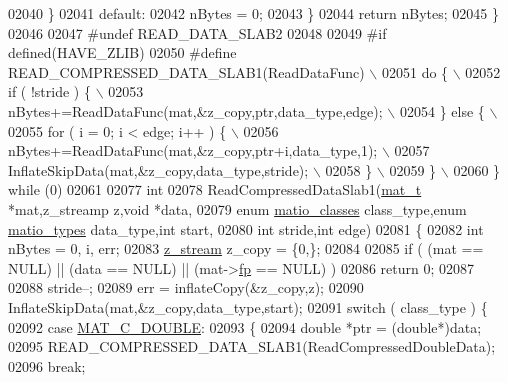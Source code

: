 \begin{DoxyCode}
{{{{{{{{{02040         \}
02041         \textcolor{keywordflow}{default}:
02042             nBytes = 0;
02043     \}
02044     \textcolor{keywordflow}{return} nBytes;
02045 \}
02046 
02047 \textcolor{preprocessor}{#undef READ\_DATA\_SLAB2}
02048 
02049 \textcolor{preprocessor}{#if defined(HAVE\_ZLIB)}
02050 \textcolor{preprocessor}{#define READ\_COMPRESSED\_DATA\_SLAB1(ReadDataFunc) \(\backslash\)}
02051 \textcolor{preprocessor}{    do \{ \(\backslash\)}
02052 \textcolor{preprocessor}{        if ( !stride ) \{ \(\backslash\)}
02053 \textcolor{preprocessor}{            nBytes+=ReadDataFunc(mat,&z\_copy,ptr,data\_type,edge); \(\backslash\)}
02054 \textcolor{preprocessor}{        \} else \{ \(\backslash\)}
02055 \textcolor{preprocessor}{            for ( i = 0; i < edge; i++ ) \{ \(\backslash\)}
02056 \textcolor{preprocessor}{                nBytes+=ReadDataFunc(mat,&z\_copy,ptr+i,data\_type,1); \(\backslash\)}
02057 \textcolor{preprocessor}{                InflateSkipData(mat,&z\_copy,data\_type,stride); \(\backslash\)}
02058 \textcolor{preprocessor}{            \} \(\backslash\)}
02059 \textcolor{preprocessor}{        \} \(\backslash\)}
02060 \textcolor{preprocessor}{    \} while (0)}
02061 
02077 \textcolor{keywordtype}{int}
02078 ReadCompressedDataSlab1(\hyperlink{struct__mat__t}{mat\_t} *mat,z\_streamp z,\textcolor{keywordtype}{void} *data,
02079     \textcolor{keyword}{enum} \hyperlink{group___m_a_t_gad4d60ae7b709fc81bfd744fb4c857c40}{matio\_classes} class\_type,\textcolor{keyword}{enum} \hyperlink{group___m_a_t_gacf7b3b879282b7ab3a51190e49bf3453}{matio\_types} data\_type,\textcolor{keywordtype}{int} start,
02080     \textcolor{keywordtype}{int} stride,\textcolor{keywordtype}{int} edge)
02081 \{
02082     \textcolor{keywordtype}{int} nBytes = 0, i, err;
02083     \hyperlink{structz__stream__s}{z\_stream} z\_copy = \{0,\};
02084 
02085     \textcolor{keywordflow}{if} ( (mat == NULL) || (data == NULL) || (mat->\hyperlink{struct__mat__t_a85f562e407ca9ad4d2a6e14f839432b7}{fp} == NULL) )
02086         \textcolor{keywordflow}{return} 0;
02087 
02088     stride--;
02089     err = inflateCopy(&z\_copy,z);
02090     InflateSkipData(mat,&z\_copy,data\_type,start);
02091     \textcolor{keywordflow}{switch} ( class\_type ) \{
02092         \textcolor{keywordflow}{case} \hyperlink{group___m_a_t_ggad4d60ae7b709fc81bfd744fb4c857c40a5d70e0862e5bdb7bd86bf7ba5948f307}{MAT\_C\_DOUBLE}:
02093         \{
02094             \textcolor{keywordtype}{double} *ptr = (\textcolor{keywordtype}{double}*)data;
02095             READ\_COMPRESSED\_DATA\_SLAB1(ReadCompressedDoubleData);
02096             \textcolor{keywordflow}{break};
}}}}}}}}}
\end{DoxyCode}
